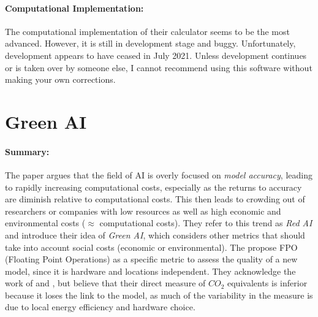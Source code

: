 \paragraph{Computational Implementation:} The computational implementation of their
calculator seems to be the most advanced. However, it is still in development stage and
buggy. Unfortunately, development appears to have ceased in July 2021. Unless
development continues or is taken over by someone else, I cannot recommend using this
software without making your own corrections.


\section{Green AI}
\centerline{}
\vspace{1em}

\paragraph{Summary:} The paper argues that the field of AI is overly focused on
\emph{model accuracy}, leading to rapidly increasing computational costs, especially as
the returns to accuracy are diminish relative to computational costs. This then leads to
crowding out of researchers or companies with low resources as well as high economic and
environmental costs ($\approx$ computational costs). They refer to this trend as
\emph{Red AI} and introduce their idea of \emph{Green AI}, which considers other metrics
that should take into account social costs (economic or environmental). The propose FPO
(Floating Point Operations) as a specific metric to assess the quality of a new model,
since it is hardware and locations independent. They acknowledge the work of
 and , but believe that their direct measure
of $CO_2$ equivalents is inferior because it loses the link to the model, as much of the
variability in the measure is due to local energy efficiency and hardware choice.
